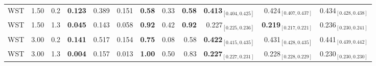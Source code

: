\begin{table}[!h]
\begin{tabular}[t]{lrrrrrrrrrrr}
WST & 1.50 & 0.2 & \textbf{0.123} & 0.389 & 0.151 & \textbf{0.58} & 0.33 & \textbf{0.58} & \textbf{0.413$_{[0.404,0.425]}$} & 0.424$_{[0.407,0.437]}$ & 0.434$_{[0.428,0.438]}$\\
WST & 1.50 & 1.3 & \textbf{0.045} & 0.143 & 0.058 & \textbf{0.92} & 0.42 & \textbf{0.92} & 0.227$_{[0.225,0.236]}$ & \textbf{0.219$_{[0.217,0.221]}$} & 0.236$_{[0.230,0.241]}$\\
WST & 3.00 & 0.2 & \textbf{0.141} & 0.517 & 0.154 & \textbf{0.75} & 0.08 & 0.58 & \textbf{0.422$_{[0.415,0.435]}$} & 0.431$_{[0.428,0.435]}$ & 0.441$_{[0.439,0.442]}$\\
WST & 3.00 & 1.3 & \textbf{0.004} & 0.157 & 0.013 & \textbf{1.00} & 0.50 & 0.83 & \textbf{0.227$_{[0.227,0.231]}$} & 0.228$_{[0.228,0.229]}$ & 0.230$_{[0.230,0.230]}$\\
\bottomrule
\end{tabular}
\end{table}
